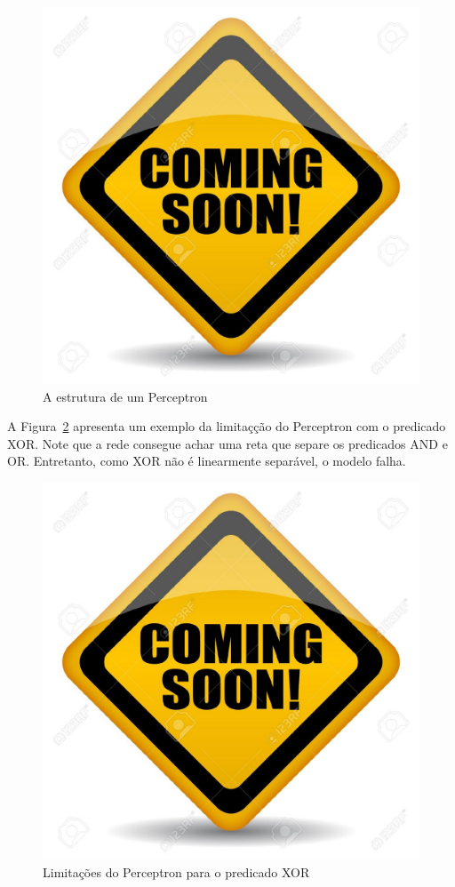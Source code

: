 \begin{figure}[h]
\centering
\includegraphics[scale=0.5]{images/cs}
\caption{A estrutura de um Perceptron}
\label{fig:perceptronStruct}
\end{figure}

A Figura~\ref{fig:perceptronXor} apresenta um exemplo da limitaçção do Perceptron com o predicado XOR. Note que a rede consegue achar uma reta que separe os predicados AND e OR. Entretanto, como XOR não é linearmente separável, o modelo falha.

\begin{figure}[h]
\centering
\includegraphics[scale=0.5]{images/cs}
\caption{Limitações do Perceptron para o predicado XOR}
\label{fig:perceptronXor}
\end{figure}

